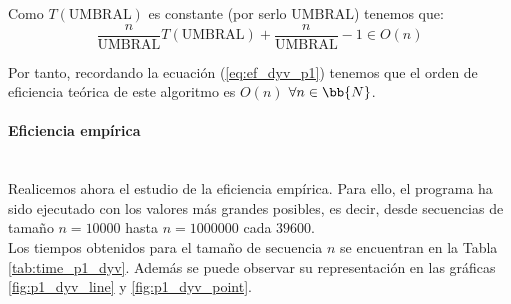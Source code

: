 \documentclass{article}
\newcommand{\myparagraph}[1]{\paragraph{#1}\mbox{}\\}
\begin{document}
Como $T(\text{UMBRAL})$ es constante (por serlo $\text{UMBRAL}$) tenemos que:
\begin{equation}
    \frac{n}{\text{UMBRAL}}T\left(\text{UMBRAL}\right) + \frac{n}{\text{UMBRAL}} - 1 \in O(n)
\end{equation}

Por tanto, recordando la ecuación (\ref{eq:ef_dyv_p1}) tenemos que el orden de eficiencia teórica de este algoritmo es $O(n)$ $\forall n \in \bb{N}$.

\myparagraph{Eficiencia empírica}

Realicemos ahora el estudio de la eficiencia empírica. Para ello, el programa ha sido ejecutado con los valores más grandes posibles, es decir, desde secuencias de tamaño $n = 10000$ hasta $n = 1000000$ cada $39600$.\\
Los tiempos obtenidos para el tamaño de secuencia $n$ se encuentran en la Tabla \ref{tab:time_p1_dyv}. Además se puede observar su representación en las gráficas \ref{fig:p1_dyv_line}
y \ref{fig:p1_dyv_point}.
\end{document}
